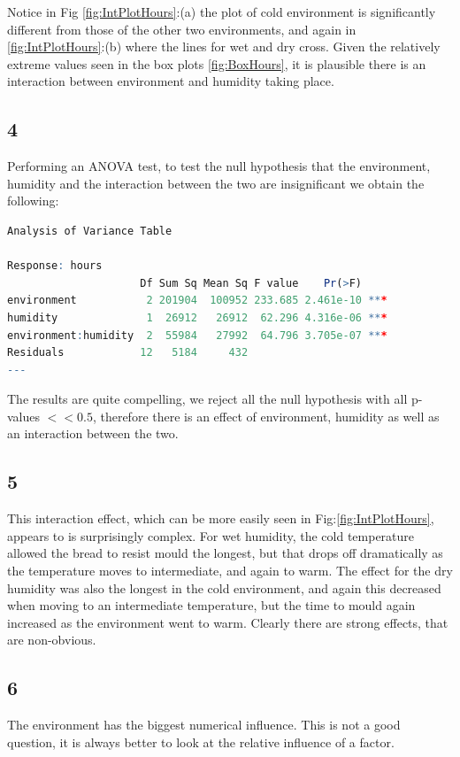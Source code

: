 \documentclass{article}
\begin{document}
Notice in Fig \ref{fig:IntPlotHours}:(a) the plot of cold environment is significantly different from those of the other two environments, and again in \ref{fig:IntPlotHours}:(b) where the lines for wet and dry cross. Given the relatively extreme values seen in the box plots \ref{fig:BoxHours}, it is plausible there is an interaction between environment and humidity taking place.     
    
    \subsection*{4}
    Performing an ANOVA test, to test the null hypothesis that the environment, humidity and the interaction between the two are insignificant we obtain the following:
      \begin{lstlisting}[language=R]
Analysis of Variance Table

Response: hours
                     Df Sum Sq Mean Sq F value    Pr(>F)    
environment           2 201904  100952 233.685 2.461e-10 ***
humidity              1  26912   26912  62.296 4.316e-06 ***
environment:humidity  2  55984   27992  64.796 3.705e-07 ***
Residuals            12   5184     432                      
---
      \end{lstlisting}
The results are quite compelling, we reject all the null hypothesis with all p-values $<< 0.5$, therefore there is an effect of environment, humidity as well as an interaction between the two.    
    
    \subsection*{5}
    This interaction effect, which can be more easily seen in Fig:\ref{fig:IntPlotHours}, appears to is surprisingly complex. For wet humidity, the cold temperature allowed the bread to resist mould the longest, but that drops off dramatically as the temperature moves to intermediate, and again to warm. The effect for the dry humidity was also the longest in the cold environment, and again this decreased when moving to an intermediate temperature, but the time to mould again increased as the environment went to warm. Clearly there are strong effects, that are non-obvious.
    
    \subsection*{6}
      The environment has the biggest numerical influence.
      This is not a good question, it is always better to look at the relative influence of a factor.
    
\end{document}
